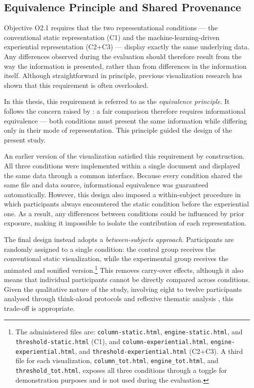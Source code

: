 \subsection{Equivalence Principle and Shared Provenance}
\label{sec:equivalence}

Objective O2.1 requires that the two representational conditions --- the conventional static representation (C1) and the machine-learning-driven experiential representation (C2+C3) --- display exactly the same underlying data. Any differences observed during the evaluation should therefore result from the way the information is presented, rather than from differences in the information itself. Although straightforward in principle, previous visualization research has shown that this requirement is often overlooked.

In this thesis, this requirement is referred to as the \emph{equivalence principle}. It follows the concern raised by \textcite{tversky2002}: a fair comparison therefore requires informational equivalence --- both conditions must present the same information while differing only in their mode of representation. This principle guided the design of the present study.

An earlier version of the visualization satisfied this requirement by construction. All three conditions were implemented within a single document and displayed the same data through a common interface. Because every condition shared the same file and data source, informational equivalence was guaranteed automatically. However, this design also imposed a within-subject procedure in which participants always encountered the static condition before the experiential one. As a result, any differences between conditions could be influenced by prior exposure, making it impossible to isolate the contribution of each representation.

The final design instead adopts a \emph{between-subjects approach}. Participants are randomly assigned to a single condition: the control group receives the conventional static visualization, while the experimental group receives the animated and sonified version.\footnote{%
The administered files are:
\texttt{column-static.html}, \texttt{engine-static.html}, and 
\texttt{threshold-static.html} (C1), and 
\texttt{column-experiential.html}, \texttt{engine-experiential.html}, and 
\texttt{threshold-experiential.html} (C2+C3). 
A third file for each visualization,
\texttt{column\_tot.html}, \texttt{engine\_tot.html}, and 
\texttt{threshold\_tot.html}, exposes all three conditions through a toggle for demonstration purposes and is not used during the evaluation.
} This removes carry-over effects, although it also means that individual participants cannot be directly compared across conditions. Given the qualitative nature of the study, involving eight to twelve participants analysed through think-aloud protocols and reflexive thematic analysis \parencite{braunclarke2006}, this trade-off is appropriate.

